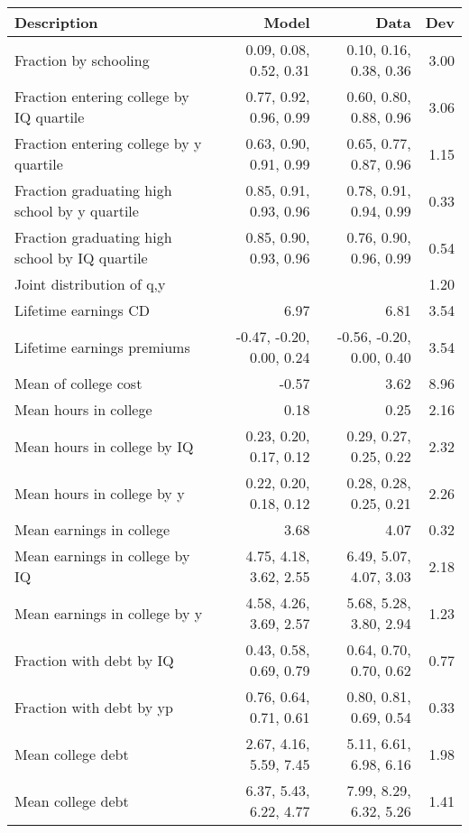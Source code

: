 \begin{tabular}{lrrr}
\hline
Description & Model  & Data  & Dev  \\ 
\hline
Fraction by schooling & 0.09, 0.08, 0.52, 0.31  & 0.10, 0.16, 0.38, 0.36  & 3.00  \\ 
Fraction entering college by IQ quartile & 0.77, 0.92, 0.96, 0.99  & 0.60, 0.80, 0.88, 0.96  & 3.06  \\ 
Fraction entering college by y quartile & 0.63, 0.90, 0.91, 0.99  & 0.65, 0.77, 0.87, 0.96  & 1.15  \\ 
Fraction graduating high school by y quartile & 0.85, 0.91, 0.93, 0.96  & 0.78, 0.91, 0.94, 0.99  & 0.33  \\ 
Fraction graduating high school by IQ quartile & 0.85, 0.90, 0.93, 0.96  & 0.76, 0.90, 0.96, 0.99  & 0.54  \\ 
Joint distribution of q,y &   &   & 1.20  \\ 
Lifetime earnings CD & 6.97  & 6.81  & 3.54  \\ 
Lifetime earnings premiums & -0.47, -0.20, 0.00, 0.24  & -0.56, -0.20, 0.00, 0.40  & 3.54  \\ 
Mean of college cost & -0.57  & 3.62  & 8.96  \\ 
Mean hours in college & 0.18  & 0.25  & 2.16  \\ 
Mean hours in college by IQ & 0.23, 0.20, 0.17, 0.12  & 0.29, 0.27, 0.25, 0.22  & 2.32  \\ 
Mean hours in college by y & 0.22, 0.20, 0.18, 0.12  & 0.28, 0.28, 0.25, 0.21  & 2.26  \\ 
Mean earnings in college & 3.68  & 4.07  & 0.32  \\ 
Mean earnings in college by IQ & 4.75, 4.18, 3.62, 2.55  & 6.49, 5.07, 4.07, 3.03  & 2.18  \\ 
Mean earnings in college by y & 4.58, 4.26, 3.69, 2.57  & 5.68, 5.28, 3.80, 2.94  & 1.23  \\ 
Fraction with debt by IQ & 0.43, 0.58, 0.69, 0.79  & 0.64, 0.70, 0.70, 0.62  & 0.77  \\ 
Fraction with debt by yp & 0.76, 0.64, 0.71, 0.61  & 0.80, 0.81, 0.69, 0.54  & 0.33  \\ 
Mean college debt & 2.67, 4.16, 5.59, 7.45  & 5.11, 6.61, 6.98, 6.16  & 1.98  \\ 
Mean college debt & 6.37, 5.43, 6.22, 4.77  & 7.99, 8.29, 6.32, 5.26  & 1.41  \\ 
\hline
\end{tabular}%
